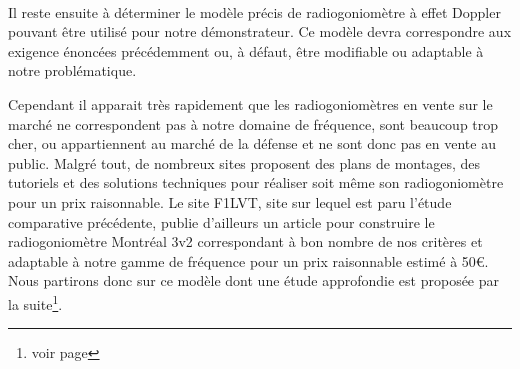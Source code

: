 ~\\


Il reste ensuite à déterminer le modèle précis de radiogoniomètre à effet Doppler pouvant être utilisé pour notre démonstrateur. Ce modèle devra correspondre aux exigence énoncées précédemment ou, à défaut, être modifiable ou adaptable à notre problématique.

Cependant il apparait très rapidement que les radiogoniomètres en vente sur le marché ne correspondent pas à notre domaine de fréquence, sont beaucoup trop cher, ou appartiennent au marché de la défense et ne sont donc pas en vente au public. Malgré tout, de nombreux sites proposent des plans de montages, des tutoriels et des solutions techniques pour réaliser soit même son radiogoniomètre pour un prix raisonnable. Le site F1LVT, site sur lequel est paru l'étude comparative précédente, publie d'ailleurs un article pour construire le radiogoniomètre Montréal 3v2 correspondant à bon nombre de nos critères et adaptable à notre gamme de fréquence pour un prix raisonnable estimé à 50\euro. Nous partirons donc sur ce modèle dont une étude approfondie est proposée par la suite\footnote{voir page \pageref{montreal}}.


